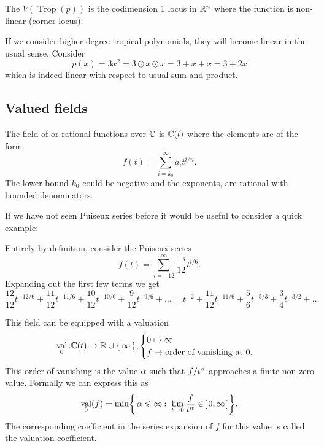 \documentclass[12pt]{memoir}
\DeclareMathOperator{\val}{val}
\DeclareMathOperator{\Trop}{Trop}
\begin{document}
\begin{Def}
    The  $V(\Trop(p))$ is the codimension 1 locus in $\mathbb{R}^n$ where the function is non-linear (corner locus).
\end{Def}

\begin{Ex}
If we consider higher degree tropical polynomials, they will become linear in the usual sense. Consider 
$$p(x)=3x^2=3\odot x\odot x=3+x+x=3+2x$$
which is indeed linear with respect to usual sum and product.
\end{Ex}

\subsection{Valued fields}

\begin{Def}
The field of  or rational functions over $\mathbb{C}$ is $\mathbb{C}(t)$ where the elements are of the form 
$$f(t)=\sum_{i=k_0}^\infty a_it^{i/n}.$$
The lower bound $k_0$ could be negative and the exponents, are rational with bounded denominators. 
\end{Def}

If we have not seen Puiseux series before it would be useful to consider a quick example:

\begin{Ex}
    Entirely by definition, consider the Puiseux series 
    $$f(t)=\sum_{i=-12}^\infty \frac{-i}{12}t^{i/6}.$$
    Expanding out the first few terms we get 
    $$\frac{12}{12}t^{-12/6}+\frac{11}{12}t^{-11/6}+\frac{10}{12}t^{-10/6}+\frac{9}{12}t^{-9/6}+\dots=t^{-2}+\frac{11}{12}t^{-11/6}+\frac{5}{6}t^{-5/3}+\frac{3}{4}t^{-3/2}+\dots$$
\end{Ex}
This field can be equipped with a valuation
$$\val_0\:\bC(t)\to\bR\cup\set{\infty},\begin{cases}
    0\mapsto \infty\\
    f\mapsto\text{order of vanishing at }0.
\end{cases}$$
This order of vanishing is the value $\alpha$ such that $f/t^\alpha$ approaches a finite non-zero value. Formally we can express this as 
$$\val_0(f)=\min\Set{\al\leq\infty\:\ \lim_{t\to0}\frac{f}{t^\al}\in\obonj{0,\infty}}.$$
The corresponding coefficient in the series expansion of $f$ for this value is called the valuation coefficient.
\end{document}
